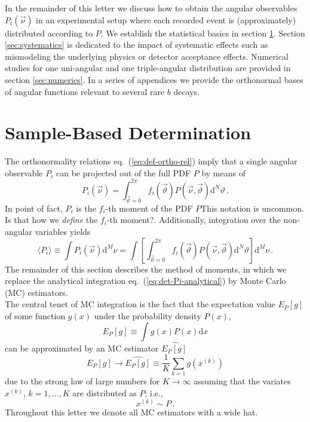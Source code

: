 \documentclass[aps,prd,reprint,nofootinbib,preprintnumbers]{revtex4}
\newcommand{\dd}{\text{d}}
\newcommand{\refeq}[1]{eq.~(\ref{eq:#1})}
\newcommand{\nuvec}{\vec{\nu}}
\newcommand{\thvec}{\vec{\vartheta}}
\renewcommand{\theta}{\vartheta}
\newcommand{\what}[1]{\widehat{#1}}
\newcommand{\fred}[1]{{\color{brown!85!black}#1}}
\begin{document}
In the remainder of this letter we discuss how to obtain the angular
observables $P_i(\nuvec)$ in an experimental setup where each recorded
event is (approximately) distributed according to $P$.  We establish
the statistical basics in section \ref{sec:sample-based-det}. Section
\ref{sec:systematics} is dedicated to the impact of systematic effects
such as mismodeling the underlying physics or detector acceptance
effects. Numerical studies for one uni-angular and one triple-angular
distribution are provided in section \ref{sec:numerics}. In a series
of appendices we provide the orthonormal bases of angular functions
relevant to several rare $b$ decays.



\section{Sample-Based Determination}
\label{sec:sample-based-det}

The orthonormality relations \refeq{def-ortho-rel} imply that a single angular observable $P_i$
can be projected out of the full PDF $P$ by means of
\begin{equation}
    \label{eq:det-Pi-analytical}
    P_i(\nuvec) = \int_{\thvec = 0}^{2\pi} f_i(\thvec) P(\nuvec, \thvec) \dd^N \theta\,.
\end{equation}
In point of fact, $P_i$ is the $f_i$-th moment of the PDF $P$\fred{This
  notation is uncommon. Is that how we \emph{define} the $f_i$-th
  moment?}. Additionally, integration over the non-angular variables
yields
\begin{equation}
    \langle P_i\rangle
    \equiv \int P_i(\nuvec) \dd^M \nu
    = \int \left[\int_{\thvec=0}^{2\pi} f_i(\thvec) P(\nuvec,\thvec) \dd^N\theta\right]\dd^M \nu\,.
\end{equation}
The remainder of this section  describes the method of moments, in which we replace the
analytical integration \refeq{det-Pi-analytical} by Monte Carlo (MC) estimators.\\


The central tenet of MC integration is the fact that the expectation value $E_P[g]$ of some function
$g(x)$ under the probability density $P(x)$,
\begin{equation}
    E_P[g] \equiv \int g(x) P(x) \dd x
\end{equation}
can be approximated \cite{MCSM-2004} by an MC estimator $\what{E_P[g]}$
\begin{equation}
    \label{eq:mc-id}
    E_P[g] \to \widehat{E_P[g]} \equiv \frac{1}{K} \sum_{k=1} g(x^{(k)})
\end{equation}
due to the strong law of large numbers for $K \to \infty$ assuming
that the variates $x^{(k)}$, $k = 1, \dots, K$ are distributed as
$P$; i.e.,
\begin{equation}
    x^{(k)} \sim P\,.
\end{equation}
Throughout this letter we denote all MC estimators with a wide hat.\\
\end{document}
